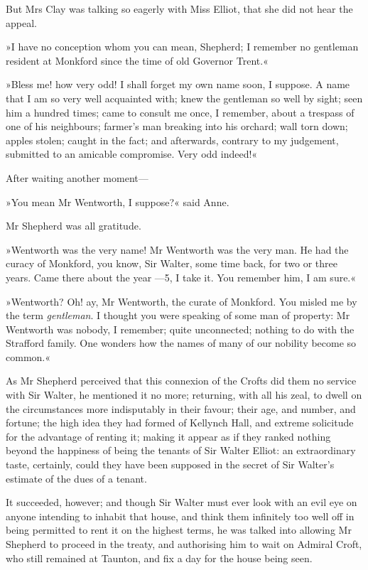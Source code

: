 But Mrs Clay was talking so eagerly with Miss Elliot, that she did not hear the appeal.

»I have no conception whom you can mean, Shepherd; I remember no gentleman resident at Monkford since the time of old Governor Trent.«

»Bless me! how very odd! I shall forget my own name soon, I suppose. A name that I am so very well acquainted with; knew the gentleman so well by sight; seen him a hundred times; came to consult me once, I remember, about a trespass of one of his neighbours; farmer's man breaking into his orchard; wall torn down; apples stolen; caught in the fact; and afterwards, contrary to my judgement, submitted to an amicable compromise. Very odd indeed!«

After waiting another moment—

»You mean Mr Wentworth, I suppose?« said Anne.

Mr Shepherd was all gratitude.

»Wentworth was the very name! Mr Wentworth was the very man. He had the curacy of Monkford, you know, Sir Walter, some time back, for two or three years. Came there about the year —5, I take it. You remember him, I am sure.«

»Wentworth? Oh! ay, Mr Wentworth, the curate of Monkford. You misled me by the term \textit{gentleman}. I thought you were speaking of some man of property: Mr Wentworth was nobody, I remember; quite unconnected; nothing to do with the Strafford family. One wonders how the names of many of our nobility become so common.«

As Mr Shepherd perceived that this connexion of the Crofts did them no service with Sir Walter, he mentioned it no more; returning, with all his zeal, to dwell on the circumstances more indisputably in their favour; their age, and number, and fortune; the high idea they had formed of Kellynch Hall, and extreme solicitude for the advantage of renting it; making it appear as if they ranked nothing beyond the happiness of being the tenants of Sir Walter Elliot: an extraordinary taste, certainly, could they have been supposed in the secret of Sir Walter's estimate of the dues of a tenant.

It succeeded, however; and though Sir Walter must ever look with an evil eye on anyone intending to inhabit that house, and think them infinitely too well off in being permitted to rent it on the highest terms, he was talked into allowing Mr Shepherd to proceed in the treaty, and authorising him to wait on Admiral Croft, who still remained at Taunton, and fix a day for the house being seen.

